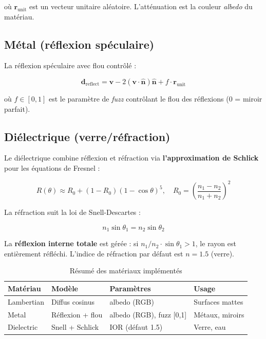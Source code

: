 \documentclass[12pt,a4paper]{article}
\begin{document}
où $\bm{r}_{\text{unit}}$ est un vecteur unitaire aléatoire. L'atténuation est
la couleur \textit{albedo} du matériau.

\subsection{Métal (réflexion spéculaire)}

La réflexion spéculaire avec flou contrôlé :

\[
\bm{d}_{\text{reflect}} = \bm{v} - 2(\bm{v} \cdot \hat{\bm{n}})\hat{\bm{n}} + f \cdot \bm{r}_{\text{unit}}
\]

où $f \in [0,1]$ est le paramètre de \textit{fuzz} contrôlant le flou des
réflexions (0 = miroir parfait).

\subsection{Diélectrique (verre/réfraction)}

Le diélectrique combine réflexion et réfraction via \textbf{l'approximation de Schlick}
pour les équations de Fresnel :

\[
R(\theta) \approx R_0 + (1 - R_0)(1 - \cos\theta)^5, \quad R_0 = \left(\frac{n_1 - n_2}{n_1 + n_2}\right)^2
\]

La réfraction suit la loi de Snell-Descartes :

\[
n_1 \sin\theta_1 = n_2 \sin\theta_2
\]

La \textbf{réflexion interne totale} est gérée : si $n_1/n_2 \cdot \sin\theta_1 > 1$,
le rayon est entièrement réfléchi. L'indice de réfraction par défaut est $n = 1.5$
(verre).

\begin{table}[H]
\centering
\begin{tabular}{llll}
\toprule
\textbf{Matériau} & \textbf{Modèle} & \textbf{Paramètres} & \textbf{Usage} \\
\midrule
Lambertian  & Diffus cosinus    & albedo (RGB)              & Surfaces mattes \\
Metal       & Réflexion + flou  & albedo (RGB), fuzz [0,1]  & Métaux, miroirs \\
Dielectric  & Snell + Schlick   & IOR (défaut 1.5)          & Verre, eau \\
\bottomrule
\end{tabular}
\caption{Résumé des matériaux implémentés}
\end{table}

\end{document}
